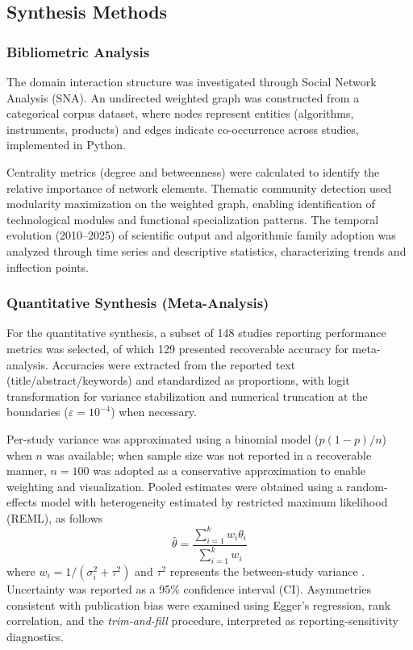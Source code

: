 \documentclass[lineno,pdflatex,sn-apa]{sn-jnl}
\begin{document}
\subsection{Synthesis Methods}

\subsubsection{Bibliometric Analysis}

The domain interaction structure was investigated through Social Network Analysis (SNA). An undirected weighted graph was constructed from a categorical corpus dataset, where nodes represent entities (algorithms, instruments, products) and edges indicate co-occurrence across studies, implemented in Python.

Centrality metrics (degree and betweenness) were calculated to identify the relative importance of network elements. Thematic community detection used modularity maximization on the weighted graph, enabling identification of technological modules and functional specialization patterns. The temporal evolution (2010--2025) of scientific output and algorithmic family adoption was analyzed through time series and descriptive statistics, characterizing trends and inflection points.

\subsubsection{Quantitative Synthesis (Meta-Analysis)}

For the quantitative synthesis, a subset of 148 studies reporting performance metrics was selected, of which 129 presented recoverable accuracy for meta-analysis. Accuracies were extracted from the reported text (title/abstract/keywords) and standardized as proportions, with logit transformation for variance stabilization and numerical truncation at the boundaries ($\varepsilon=10^{-4}$) when necessary.

Per-study variance was approximated using a binomial model ($p(1-p)/n$) when $n$ was available; when sample size was not reported in a recoverable manner, $n=100$ was adopted as a conservative approximation to enable weighting and visualization. Pooled estimates were obtained using a random-effects model with heterogeneity estimated by restricted maximum likelihood (REML), as follows
\begin{equation}
\hat{\theta} = \frac{\sum_{i=1}^{k} w_i \theta_i}{\sum_{i=1}^{k} w_i}
\end{equation}
where $w_i = 1/(\sigma_i^2 + \tau^2)$ and $\tau^2$ represents the between-study variance \citep{Viechtbauer2010}. Uncertainty was reported as a 95\% confidence interval (CI). Asymmetries consistent with publication bias were examined using Egger's regression, rank correlation, and the \textit{trim-and-fill} procedure, interpreted as reporting-sensitivity diagnostics.
\end{document}
